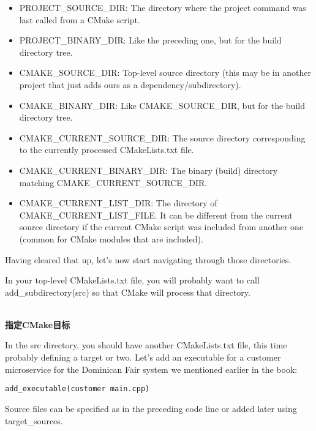 \begin{itemize}
\item 
PROJECT\_SOURCE\_DIR: The directory where the project command was last called from a CMake script.

\item 
PROJECT\_BINARY\_DIR: Like the preceding one, but for the build directory tree.

\item 
CMAKE\_SOURCE\_DIR: Top-level source directory (this may be in another project that just adds ours as a dependency/subdirectory).

\item 
CMAKE\_BINARY\_DIR: Like CMAKE\_SOURCE\_DIR, but for the build directory tree.

\item 
CMAKE\_CURRENT\_SOURCE\_DIR: The source directory corresponding to the currently processed CMakeLists.txt file.

\item 
CMAKE\_CURRENT\_BINARY\_DIR: The binary (build) directory
matching CMAKE\_CURRENT\_SOURCE\_DIR.

\item 
CMAKE\_CURRENT\_LIST\_DIR: The directory of CMAKE\_CURRENT\_LIST\_FILE. It can be different from the current source directory if the current CMake script was included from another one (common for CMake modules that are included).
\end{itemize}

Having cleared that up, let's now start navigating through those directories.

In your top-level CMakeLists.txt file, you will probably want to call add\_subdirectory(src) so that CMake will process that directory.

\hspace*{\fill} \\ %
\noindent
\textbf{指定CMake目标}

In the src directory, you should have another CMakeLists.txt file, this time probably defining a target or two. Let's add an executable for a customer microservice for the Dominican Fair system we mentioned earlier in the book:

\begin{lstlisting}[style=styleCMake]
add_executable(customer main.cpp)
\end{lstlisting}

Source files can be specified as in the preceding code line or added later using target\_sources.

